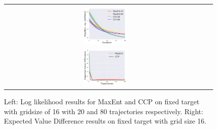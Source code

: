 \documentclass{article}
\def\MSHangBox#1{%
\begin{minipage}[t]{\textwidth}%
\begin{tabbing} %
~\\[-\baselineskip] %
#1 %
\end{tabbing}%
\end{minipage}} %
\begin{document}
\begin{figure}[t]
\centering
  \begin{tabular}{cc}
    \MSHangBox{\includegraphics[width=0.22\textwidth]{images/gridworld/mazeworld/log_likelihood/test_ll_vs_iterations_traj_20_80.pdf}}&
    \MSHangBox{\includegraphics[width=0.22\textwidth]{images/gridworld/mazeworld/evd_maxent_vs_ccp_grid_16_complex_obstacle.pdf}}
    \end{tabular}
    \caption{Left: Log likelihood results for MaxEnt and CCP on fixed target with gridsize of 16 with 20 and 80 trajectories respectively. Right: Expected Value Difference results on fixed target with grid size 16.}
    \label{fig:img_maxent_vs_ccp_gridworld}
\end{figure}
\end{document}
